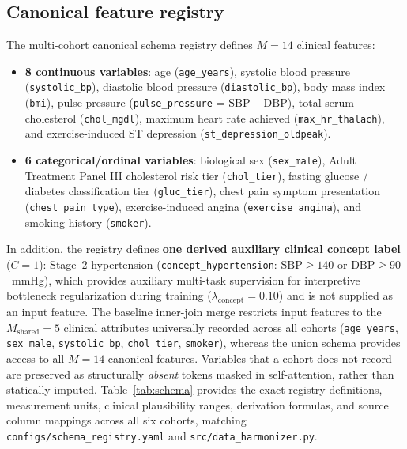 \documentclass[journal]{IEEEtran}
\begin{document}
\subsection{Canonical feature registry}\label{sec:schema}
The multi-cohort canonical schema registry defines $M=14$ clinical features:
\begin{itemize}
\item \textbf{8 continuous variables}: age (\texttt{age\_years}), systolic blood pressure (\texttt{systolic\_bp}), diastolic blood pressure (\texttt{diastolic\_bp}), body mass index (\texttt{bmi}), pulse pressure (\texttt{pulse\_pressure} = $\mathrm{SBP}-\mathrm{DBP}$), total serum cholesterol (\texttt{chol\_mgdl}), maximum heart rate achieved (\texttt{max\_hr\_thalach}), and exercise-induced ST depression (\texttt{st\_depression\_oldpeak}).
\item \textbf{6 categorical/ordinal variables}: biological sex (\texttt{sex\_male}), Adult Treatment Panel III cholesterol risk tier (\texttt{chol\_tier}), fasting glucose / diabetes classification tier (\texttt{gluc\_tier}), chest pain symptom presentation (\texttt{chest\_pain\_type}), exercise-induced angina (\texttt{exercise\_angina}), and smoking history (\texttt{smoker}).
\end{itemize}
In addition, the registry defines \textbf{one derived auxiliary clinical concept label} ($C=1$): Stage~2 hypertension (\texttt{concept\_hypertension}: $\mathrm{SBP}\ge 140$ or $\mathrm{DBP}\ge 90$~mmHg), which provides auxiliary multi-task supervision for interpretive bottleneck regularization during training ($\lambda_{\mathrm{concept}}=0.10$) and is not supplied as an input feature.
The baseline inner-join merge restricts input features to the $M_{\mathrm{shared}}=5$ clinical attributes universally recorded across all cohorts (\texttt{age\_years}, \texttt{sex\_male}, \texttt{systolic\_bp}, \texttt{chol\_tier}, \texttt{smoker}), whereas the union schema provides access to all $M=14$ canonical features. Variables that a cohort does not record are preserved as structurally \emph{absent} tokens masked in self-attention, rather than statically imputed. Table~\ref{tab:schema} provides the exact registry definitions, measurement units, clinical plausibility ranges, derivation formulas, and source column mappings across all six cohorts, matching \texttt{configs/schema\_registry.yaml} and \texttt{src/data\_harmonizer.py}.
\end{document}
